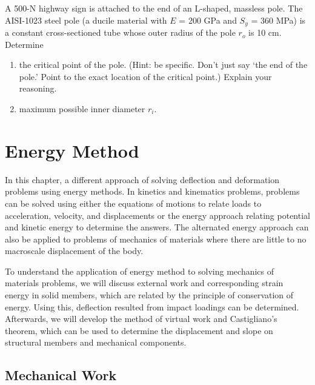 \documentclass[
10pt,
a4paper,
openany,
svgnames,
]{book} %
\newcommand{\exercise}{%
\item\label{lab:\arabic{chapter}.\arabic{exercisesi}}  %
}
\begin{document}
\begin{exercises}
  \exercise A 500-N highway sign is attached to the end of an L-shaped,
  massless pole. The AISI-1023 steel pole (a ducile material with $E$
  = 200 GPa and $S_y$ = 360 MPa) is a constant cross-sectioned tube
  whose outer radius of the pole $r_o$ is 10 cm. Determine
  \begin{enumerate}
  \item the critical point of the pole. (Hint: be specific. Don't just
    say `the end of the pole.' Point to the exact location of the critical
    point.) Explain your reasoning.
  \item maximum possible inner diameter $r_i$.
  \end{enumerate}
  
\end{exercises}


\chapter{Energy Method}

In this chapter, a different approach of solving deflection and deformation problems using energy methods. In kinetics and kinematics problems, problems can be solved using either the equations of motions to relate loads to acceleration, velocity, and displacements or the energy approach relating potential and kinetic energy to determine the answers. The alternated energy approach can also be applied to problems of mechanics of materials where there are little to no macroscale displacement of the body.

To understand the application of energy method to solving mechanics of materials problems, we will discuss external work and corresponding strain energy in solid members, which are related by the principle of conservation of energy. Using this, deflection resulted from impact loadings can be determined. Afterwards, we will develop the method of virtual work and Castigliano's theorem, which can be used to determine the displacement and slope on structural members and mechanical components.

\section{Mechanical Work}
\end{document}
